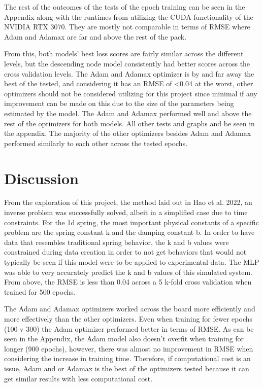 \documentclass[12pt]{article}
\begin{document}
	The rest of the outcomes of the tests of the epoch training can be seen in the Appendix along with the runtimes from utilizing the CUDA functionality of the NVIDIA RTX 3070. They are mostly not comparable in terms of RMSE where Adam and Adamax are far and above the rest of the pack. 

	From this, both models' best loss scores are fairly similar across the different levels, but the descending node model consistently had better scores across the cross validation levels. The Adam and Adamax optimizer is by and far away the best of the tested, and considering it has an RMSE of <0.04  at the worst, other optimizers should not be considered utilizing for this project since minimal if any improvement can be made on this due to the size of the parameters being estimated by the model. The Adam and Adamax performed well and above the rest of the optimizers for both models. All other tests and graphs and be seen in the appendix. The majority of the other optimizers besides Adam and Adamax performed similarly to each other across the tested epochs.

\section*{Discussion}

	From the exploration of this project, the method laid out in Hao et al. 2022, an inverse problem was successfully solved, albeit in a simplified case due to time constraints. For the 1d spring, the most important physical constants of a specific problem are the spring constant k and the damping constant b. In order to have data that resembles traditional spring behavior, the k and b values were constrained during data creation in order to not get behaviors that would not typically be seen if this model were to be applied to experimental data. The MLP was able to very accurately predict the k and b values of this simulated system. From above, the RMSE is less than 0.04 across a 5 k-fold cross validation when trained for 500 epochs.

	The Adam and Adamax optimizers worked across the board more efficiently and more effectively than the other optimizers. Even when training for fewer epochs (100 v 300) the Adam optimizer performed better in terms of RMSE. As can be seen in the Appendix, the Adam model also doesn't overfit when training for longer (900 epochs), however, there was almost no improvement in RMSE when considering the increase in training time. Therefore, if computational cost is an issue, Adam and or Adamax is the best of the optimizers tested because it can get similar results with less computational cost. 
\end{document}
